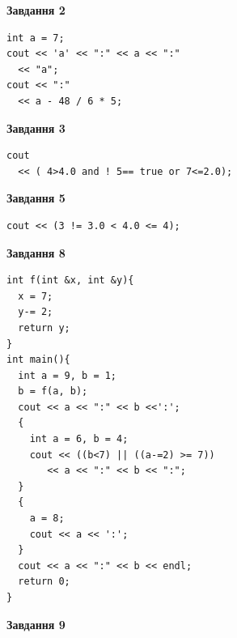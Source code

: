 \documentclass[12pt, ukrainian]{article}
\begin{document}
{\begin {large}
\begin{minipage}[t]{7.0cm}
\end{minipage}
\vline \hspace{1mm}
\begin{minipage}[t]{11.0cm}

\begin{center}
\textbf{Завдання 2}
\end{center}
\vspace{-8mm}

\begin{verbatim}
int a = 7;
cout << 'a' << ":" << a << ":" 
  << "a";
cout << ":" 
  << a - 48 / 6 * 5;
\end{verbatim}



\begin{center}
\textbf{Завдання 3}
\end{center}
\vspace{-8mm}

\begin{verbatim}
cout 
  << ( 4>4.0 and ! 5== true or 7<=2.0);
\end{verbatim}



\begin{center}
\textbf{Завдання 5}
\end{center}
\vspace{-8mm}

\begin{verbatim}
cout << (3 != 3.0 < 4.0 <= 4);
\end{verbatim}



\begin{center}
\textbf{Завдання 8}
\end{center}
\vspace{-8mm}

\begin{verbatim}
int f(int &x, int &y){
  x = 7;
  y-= 2;
  return y;
}
int main(){
  int a = 9, b = 1;
  b = f(a, b);
  cout << a << ":" << b <<':';
  {
    int a = 6, b = 4;
    cout << ((b<7) || ((a-=2) >= 7))
       << a << ":" << b << ":";
  }
  {
    a = 8;
    cout << a << ':';
  }
  cout << a << ":" << b << endl;
  return 0;
}
\end{verbatim}

\end{minipage}


\begin{minipage}[t]{7.0cm}

\begin{center}
\textbf{Завдання 9}
\end{center}
\vspace{-8mm}


\end{minipage}
\end{large}}
\end{document}
